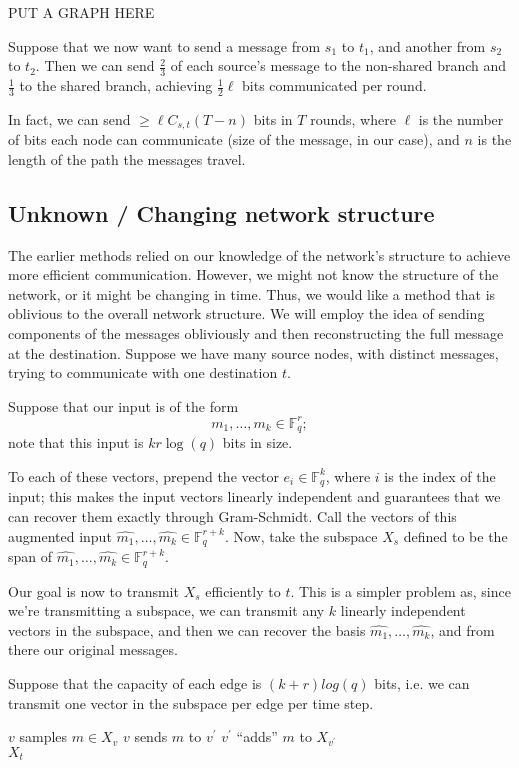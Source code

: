 \documentclass[11pt]{article}
\newcommand{\F}{\mathbb{F}}
\begin{document}
PUT A GRAPH HERE

Suppose that we now want to send a message from $s_1$ to $t_1$, and another from $s_2$ to $t_2$. Then
we can send $\frac{2}{3}$ of each source's message to the non-shared branch and $\frac{1}{3}$ to the 
shared branch, achieving $\frac{1}{2}\ell$ bits communicated per round.

In fact, we can send $\geq \ell C_{s,t} (T - n)$ bits in $T$ rounds, where $\ell$ is the number of bits
each node can communicate (size of the message, in our case), and $n$ is the length of the path the 
messages travel.

\subsection{Unknown / Changing network structure}

The earlier methods relied on our knowledge of the network's structure to achieve more efficient 
communication. However, we might not know the structure of the network, or it might be changing in time.
Thus, we would like a method that is oblivious to the overall network structure. We will employ the idea
of sending components of the messages obliviously and then reconstructing the full message at the destination.
Suppose we have many source nodes, with distinct messages, trying to communicate with one destination $t$.

Suppose that our input is of the form
$$
m_1, \ldots, m_k \in \F_q^r;
$$
note that this input is $kr\log(q)$ bits in size.

To each of these vectors, prepend the vector $e_i \in \F_q^k$, where $i$ is the index of the input;
this makes the input vectors linearly independent and guarantees that we can recover them exactly through
Gram-Schmidt. Call the vectors of this augmented input $\hat{m_1}, \ldots, \hat{m_k} \in \F_q^{r+k}$.
Now, take the subspace $X_s$ defined to be the span of $\hat{m_1}, \ldots, \hat{m_k} \in \F_q^{r+k}$.

Our goal is now to transmit $X_s$ efficiently to $t$. This is a simpler problem as, since we're transmitting a subspace,
we can transmit any $k$ linearly independent vectors in the subspace, and then we can recover the basis
$\hat{m_1}, \ldots, \hat{m_k}$, and from there our original messages. 

Suppose that the capacity of each edge is $(k+r)log(q)$ bits, i.e. we can transmit one vector in the 
subspace per edge per time step.

\begin{algorithm}[H]
\begin{algorithmic}
    \State $v$ samples $m \in X_v$
    \State $v$ sends $m$ to $v^\prime$
    \State $v^\prime$ ``adds'' $m$ to $X_{v^\prime}$
  \EndFor \\
  \Return $X_t$
\EndFunction
\end{algorithmic}
\end{algorithm}
\end{document}
